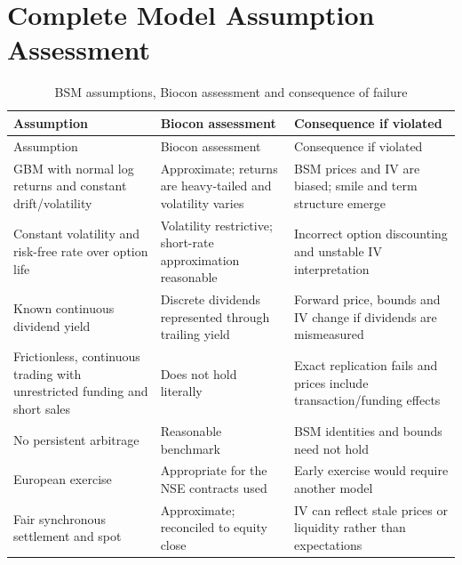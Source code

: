 \documentclass[10pt,a4paper]{article}
\begin{document}
\section{Complete Model Assumption Assessment}\label{app:assumptions}
\small
\begin{longtable}{p{}p{}p{}}
\caption{BSM assumptions, Biocon assessment and consequence of failure}\\
\toprule Assumption & Biocon assessment & Consequence if violated\\\midrule\endfirsthead
\toprule Assumption & Biocon assessment & Consequence if violated\\\midrule\endhead
GBM with normal log returns and constant drift/volatility & Approximate; returns are heavy-tailed and volatility varies & BSM prices and IV are biased; smile and term structure emerge\\
Constant volatility and risk-free rate over option life & Volatility restrictive; short-rate approximation reasonable & Incorrect option discounting and unstable IV interpretation\\
Known continuous dividend yield & Discrete dividends represented through trailing yield & Forward price, bounds and IV change if dividends are mismeasured\\
Frictionless, continuous trading with unrestricted funding and short sales & Does not hold literally & Exact replication fails and prices include transaction/funding effects\\
No persistent arbitrage & Reasonable benchmark & BSM identities and bounds need not hold\\
European exercise & Appropriate for the NSE contracts used & Early exercise would require another model\\
Fair synchronous settlement and spot & Approximate; reconciled to equity close & IV can reflect stale prices or liquidity rather than expectations\\
\bottomrule
\end{longtable}
\end{document}
